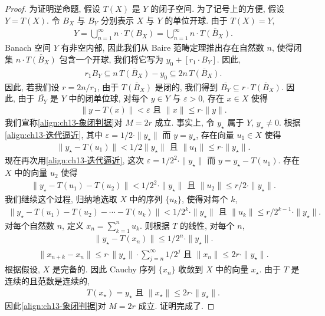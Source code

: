 \documentclass[../../main.tex]{subfiles}
\begin{document}
\begin{proof}
为证明逆命题, 假设 $T(X)$ 是 $Y$ 的闭子空间. 为了记号上的方便, 假设 $Y=T(X)$. 令 $B_{X}$ 与 $B_{Y}$ 分别表示 $X$ 与 $Y$ 的单位开球. 由于 $T(X)=Y$,
\begin{align*}
Y=\bigcup_{n=1}^{\infty}n\cdot T(B_{X})=\bigcup_{n=1}^{\infty}n\cdot\overline{T(B_{X})}.
\end{align*}
Banach 空间 $Y$ 有非空内部, 因此我们从 Baire 范畴定理推出存在自然数 $n$, 使得闭集 $n\cdot\overline{T(B_{X})}$ 包含一个开球, 我们将它写为 $y_{0}+[r_{1}\cdot B_{Y}]$. 因此,
\begin{align*}
r_{1}B_{Y}\subseteq n\,\overline{T(B_{X})}-y_{0}\subseteq 2n\,\overline{T(B_{X})}.
\end{align*}
因此, 若我们设 $r=2n/r_{1}$, 由于 $\overline{T(B_{X})}$ 是闭的, 我们得到 $\overline{B_{Y}}\subseteq r\cdot\overline{T(B_{X})}$. 因此, 由于 $\overline{B_{Y}}$ 是 $Y$ 中的闭单位球, 对每个 $y\in Y$ 与 $\varepsilon>0$, 存在 $x\in X$ 使得
\begin{align}
\|y-T(x)\|<\varepsilon\text{ 且 }\|x\|\leqslant r\cdot\|y\|.\label{align:ch13-迭代逼近}
\end{align}
我们宣称\eqref{align:ch13-象闭判据}对 $M=2r$ 成立. 事实上, 令 $y_{\star}$ 属于 $Y$, $y_{\star}\neq 0$. 根据\eqref{align:ch13-迭代逼近}, 其中 $\varepsilon=1/2\cdot\|y_{\star}\|$ 而 $y=y_{\star}$, 存在向量 $u_{1}\in X$ 使得
\begin{align*}
\|y_{\star}-T(u_{1})\|<1/2\|y_{\star}\|\text{ 且 }\|u_{1}\|\leqslant r\cdot\|y_{\star}\|.
\end{align*}
现在再次用\eqref{align:ch13-迭代逼近}, 这次 $\varepsilon=1/2^{2}\cdot\|y_{\star}\|$ 而 $y=y_{\star}-T(u_{1})$. 存在 $X$ 中的向量 $u_{2}$ 使得
\begin{align*}
\|y_{\star}-T(u_{1})-T(u_{2})\|<1/2^{2}\cdot\|y_{\star}\|\text{ 且 }\|u_{2}\|\leqslant r/2\cdot\|y_{\star}\|.
\end{align*}
我们继续这个过程, 归纳地选取 $X$ 中的序列 $\{u_{k}\}$, 使得对每个 $k$,
\begin{align*}
\|y_{\star}-T(u_{1})-T(u_{2})-\cdots-T(u_{k})\|<1/2^{k}\cdot\|y_{\star}\|\text{ 且 }\|u_{k}\|\leqslant r/2^{k-1}\cdot\|y_{\star}\|.
\end{align*}
对每个自然数 $n$, 定义 $x_{n}=\sum_{k=1}^{n}u_{k}$. 则根据 $T$ 的线性, 对每个 $n$,
\begin{align*}
\|y_{\star}-T(x_{n})\|\leqslant 1/2^{n}\cdot\|y_{\star}\|.
\end{align*}
\begin{align*}
\|x_{n+k}-x_{n}\|\leqslant r\cdot\|y_{\star}\|\cdot\sum_{j=n}^{\infty}1/2^{j}\text{ 且 }\|x_{n}\|\leqslant 2r\cdot\|y_{\star}\|.
\end{align*}
根据假设, $X$ 是完备的. 因此 Cauchy 序列 $\{x_{n}\}$ 收敛到 $X$ 中的向量 $x_{\star}$. 由于 $T$ 是连续的且范数是连续的,
\begin{align*}
T(x_{\star})=y_{\star}\text{ 且 }\|x_{\star}\|\leqslant 2r\cdot\|y_{\star}\|.
\end{align*}
因此\eqref{align:ch13-象闭判据}对 $M=2r$ 成立. 证明完成了.
\end{proof}
\end{document}
